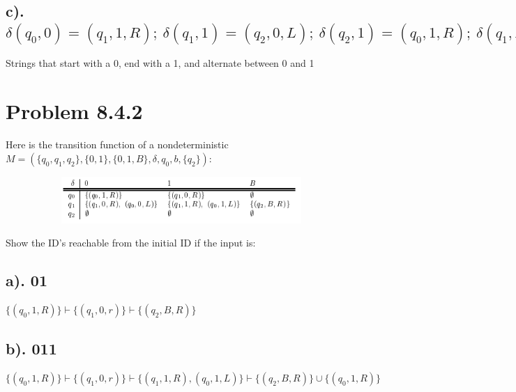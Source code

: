 \documentclass[20pt]{article} %
\begin{document}
\subsection{c). $\delta(q_0, 0) = (q_1, 1, R); \ \delta(q_1, 1) = (q_2, 0, L); \ \delta(q_2, 1) = (q_0, 1, R); \ \delta(q_1, B) = (q_f, B, R)$}
Strings that start with a 0, end with a 1, and alternate between 0 and 1
\section{Problem 8.4.2}
Here is the transition function of a nondeterministic $M = (\{q_0, q_1, q_2\}, \{0,1\}, \{0,1,B\}, \delta, q_0, b, \{q_2\})$:
\begin{figure}[!htbp]
  	\centering
   	\begin{subfigure}[p]{0.7\linewidth}
    	\includegraphics[width=\linewidth]{./figures/HW9fig2.png}
   	\end{subfigure}
\end{figure} 
Show the ID's reachable from the initial ID if the input is:
\subsection{a). 01}
$\{(q_0, 1, R)\} \vdash \{(q_1, 0, r)\} \vdash \{(q_2, B, R)\}$
\subsection{b). 011}
$\{(q_0, 1, R)\} \vdash \{(q_1, 0, r)\} \vdash \{(q_1, 1, R), (q_0, 1, L)\} \vdash \{(q_2, B, R) \} \cup \{(q_0, 1, R)\}$
\end{document}
